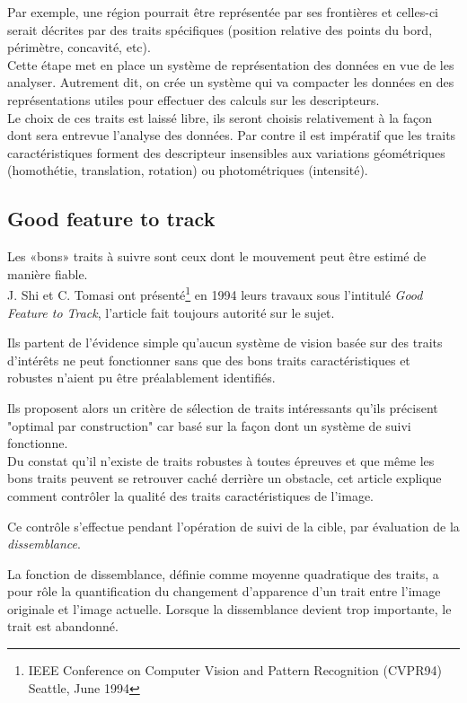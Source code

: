 \documentclass[a4paper,12pt]{report}
\begin{document}
Par exemple, une région pourrait être représentée par ses frontières et celles-ci serait décrites par des traits spécifiques (position relative des points du bord, périmètre, concavité, etc).
\\

Cette étape met en place un système de représentation des données en vue de les analyser. Autrement dit, on crée un système qui va compacter les données en des représentations utiles pour effectuer des calculs sur les descripteurs.\\

Le choix de ces traits est laissé libre, ils seront choisis relativement à la façon dont sera entrevue l'analyse des données. Par contre il est impératif que les traits caractéristiques forment des descripteur insensibles aux variations géométriques (homothétie, translation, rotation) ou photométriques (intensité).   
\subsection{Good feature to track}
Les «bons» traits à suivre sont ceux dont le mouvement peut être estimé de manière fiable.\\

J. Shi et C. Tomasi ont présenté\footnote{IEEE Conference on Computer Vision and Pattern Recognition (CVPR94) Seattle, June 1994} en 1994 leurs travaux sous l'intitulé \textit{Good Feature to Track}, l'article fait toujours autorité sur le sujet. 

Ils partent de l'évidence simple qu'aucun système de vision basée sur des traits d'intérêts ne peut fonctionner sans que des bons traits caractéristiques et robustes n'aient pu être préalablement identifiés. 

Ils proposent alors un critère de sélection de traits intéressants qu'ils précisent "optimal par construction" car basé sur la façon dont un système de suivi fonctionne.\\

Du constat qu'il n'existe de traits robustes à toutes épreuves et que même les bons traits peuvent se retrouver caché derrière un obstacle, cet article explique comment contrôler la qualité des traits caractéristiques de l'image.

Ce contrôle s'effectue pendant l'opération de suivi de la cible, par évaluation de la \textit{dissemblance}. 

La fonction de dissemblance, définie comme moyenne quadratique des traits, a pour rôle la quantification du changement d'apparence d'un trait entre l'image originale et l'image actuelle. Lorsque la dissemblance devient trop importante, le trait est abandonné.\\
\end{document}
